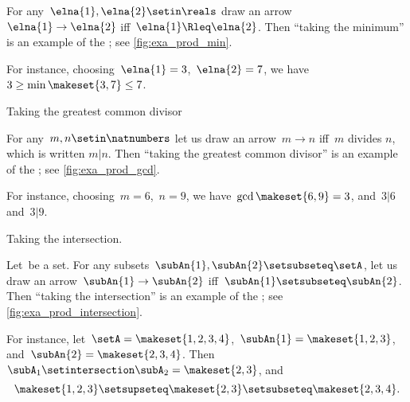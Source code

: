 \begin{example}
    \label{exa:min-as-prod}
    For any~$\elna{1},\elna{2}\setin \reals$ draw an arrow~$\elna{1}\to \elna{2}$ iff~$\elna{1}\Rleq \elna{2}$.
    Then ``taking the minimum'' is an example of the ; see \cref{fig:exa_prod_min}.

    For instance, choosing~$\elna{1} = 3$,~$\elna{2} = 7$, we have~$3 \geq \min \makeset{3, 7} \leq 7$.
\end{example}

\begin{marginfigure}
    \centering
    \caption{Taking the greatest common divisor}
    \label{fig:exa_prod_gcd}
\end{marginfigure}

\begin{example}
    \label{exa:gcd-as-prod}
    For any~$m, n \setin \natnumbers$ let us draw an arrow~$m \to n$ iff~$m$ divides $n$, which is written $m | n$.
    Then ``taking the greatest common divisor'' is an example of the ; see \cref{fig:exa_prod_gcd}.

    For instance, choosing~$m = 6$,~$n = 9$, we have~$\gcd \makeset{6, 9 } = 3$, and~$3 | 6$ and~$3 | 9$.
\end{example}

\begin{marginfigure}
    \centering
    \caption{Taking the intersection.}
    \label{fig:exa_prod_intersection}
\end{marginfigure}

\begin{example}
    \label{exa:intersection-as-prod}
    Let~\setA be a set.
    For any subsets~$\subAn{1}, \subAn{2} \setsubseteq \setA$, let us draw an arrow~$\subAn{1} \to \subAn{2}$ iff~$\subAn{1} \setsubseteq \subAn{2}$.
    Then ``taking the intersection'' is an example of the ; see \cref{fig:exa_prod_intersection}.

    For instance, let~$\setA = \makeset{ 1, 2, 3, 4 }$,~$\subAn{1} = \makeset{ 1, 2, 3 }$, and~$\subAn{2} = \makeset{2, 3, 4 }$.
    Then~$\subA_1 \setintersection \subA_2 = \makeset{2, 3 }$, and
    \begin{equation}
        \makeset{ 1, 2, 3 } \setsupseteq \makeset{2, 3 } \setsubseteq \makeset{2, 3, 4 }.
    \end{equation}
\end{example}

